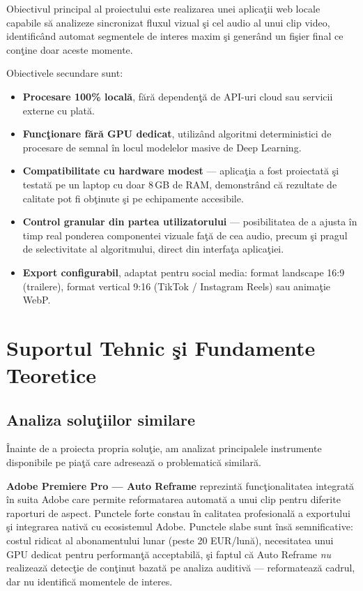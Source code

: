 \documentclass[12pt,a4paper]{article}
\begin{document}
Obiectivul principal al proiectului este realizarea unei aplica\c{t}ii web locale capabile s\u{a}{} analizeze sincronizat fluxul vizual \c{s}i cel audio al unui clip video, identific\^{a}nd automat segmentele de interes maxim \c{s}i gener\^{a}nd un fi\c{s}ier final ce con\c{t}ine doar aceste momente.

Obiectivele secundare sunt:
\begin{itemize}[noitemsep]
    \item \textbf{Procesare 100\% local\u{a}}, f\u{a}r\u{a}{} dependen\c{t}\u{a}{} de API-uri cloud sau servicii externe cu plat\u{a}.
    \item \textbf{Func\c{t}ionare f\u{a}r\u{a}{} GPU dedicat}, utiliz\^{a}nd algoritmi deterministici de procesare de semnal \^{i}n locul modelelor masive de Deep Learning.
    \item \textbf{Compatibilitate cu hardware modest} --- aplica\c{t}ia a fost proiectat\u{a}{} \c{s}i testat\u{a}{} pe un laptop cu doar 8\,GB de RAM, demonstr\^{a}nd c\u{a}{} rezultate de calitate pot fi ob\c{t}inute \c{s}i pe echipamente accesibile.
    \item \textbf{Control granular din partea utilizatorului} --- posibilitatea de a ajusta \^{i}n timp real ponderea componentei vizuale fa\c{t}\u{a}{} de cea audio, precum \c{s}i pragul de selectivitate al algoritmului, direct din interfa\c{t}a aplica\c{t}iei.
    \item \textbf{Export configurabil}, adaptat pentru social media: format landscape 16:9 (trailere), format vertical 9:16 (TikTok / Instagram Reels) sau anima\c{t}ie WebP.
\end{itemize}


\section{Suportul Tehnic \c{s}i Fundamente Teoretice}

\subsection{Analiza solu\c{t}iilor similare}

\^{I}nainte de a proiecta propria solu\c{t}ie, am analizat principalele instrumente disponibile pe pia\c{t}\u{a}{} care adreseaz\u{a}{} o problematic\u{a}{} similar\u{a}.

\textbf{Adobe Premiere Pro --- Auto Reframe} \cite{adobe2026} reprezint\u{a}{} func\c{t}ionalitatea integrat\u{a}{} \^{i}n suita Adobe care permite reformatarea automat\u{a}{} a unui clip pentru diferite raporturi de aspect. Punctele forte constau \^{i}n calitatea profesional\u{a}{} a exportului \c{s}i integrarea nativ\u{a}{} cu ecosistemul Adobe. Punctele slabe sunt \^{i}ns\u{a}{} semnificative: costul ridicat al abonamentului lunar (peste 20 EUR/lun\u{a}), necesitatea unui GPU dedicat pentru performan\c{t}\u{a}{} acceptabil\u{a}, \c{s}i faptul c\u{a}{} Auto Reframe \textit{nu} realizeaz\u{a}{} detec\c{t}ie de con\c{t}inut bazat\u{a}{} pe analiza auditiv\u{a}{} --- reformateaz\u{a}{} cadrul, dar nu identific\u{a}{} momentele de interes.
\end{document}
